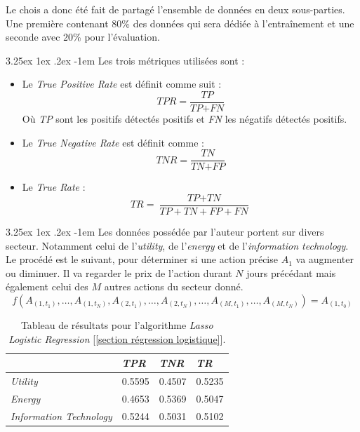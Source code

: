\documentclass[a4paper, 11pt]{article}
\makeatletter
\newcounter{subsubsubsection}[subsubsection]
\renewcommand\paragraph{\@startsection{paragraph}{5}{\z@}%
  {3.25ex \@plus1ex \@minus.2ex}%
  {-1em}%
  {\normalfont\normalsize\bfseries}}
\makeatother
\begin{document}
Le chois a donc été fait de partagé l'ensemble de données en deux sous-parties. Une première contenant 80\% des données qui sera dédiée à l'entraînement et une seconde avec 20\% pour l'évaluation.

\paragraph{}
Les trois métriques utilisées sont :
\begin{itemize}
\item Le \textit{True Positive Rate} est définit comme suit :
$$\textit{TPR} = \frac{\textit{TP}}{\textit{TP} + \textit{FN}}$$
Où \textit{TP} sont les positifs détectés positifs et \textit{FN} les négatifs détectés positifs.
\item Le \textit{True Negative Rate} est définit comme :
$$\textit{TNR} = \frac{\textit{TN}}{\textit{TN} + \textit{FP}}$$

\item Le \textit{True Rate} :
$$\textit{TR} = \frac{\textit{TP} + \textit{TN}}{\textit{TP} + \textit{TN} + \textit{FP} + \textit{FN}}$$
\end{itemize}

\paragraph{}
Les données possédée par l'auteur portent sur divers secteur. Notamment celui de l'\textit{utility}, de l'\textit{energy} et de l'\textit{information technology}. Le procédé est le suivant, pour déterminer si une action précise $A_1$ va augmenter ou diminuer. Il va regarder le prix de l'action durant $N$ jours précédant mais également celui des $M$ autres actions du secteur donné.
$$f(A_{(1,t_1)},\dots, A_{(1,t_N)}, A_{(2,t_1)}, \dots, A_{(2,t_N)}, \dots, A_{(M,t_1)},\dots,A_{(M,t_N)}) = A_{(1,t_0)}$$


\begin{table}[h!]
	\centering
\begin{tabular}{|l|l|l|l|}
	\hline
	\ & \textit{TPR} & \textit{TNR} & \textit{TR}\\
	\hline
	\textit{Utility} & 0.5595 & 0.4507 & 0.5235 \\
	\hline
	\textit{Energy} & 0.4653 & 0.5369 & 0.5047\\
	\hline
	\textit{Information Technology} & 0.5244 & 0.5031 & 0.5102\\
	\hline
\end{tabular}
\caption{Tableau de résultats pour l'algorithme \textit{Lasso Logistic Regression} [\ref{section régression logistique}].}
\end{table}
\end{document}
